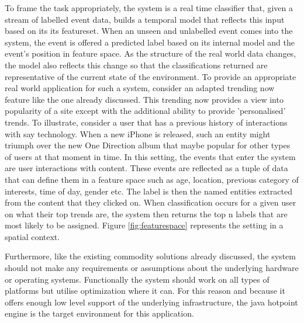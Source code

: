 \documentclass[a4paper,11pt]{scrreprt}
\begin{document}
To frame the task appropriately, the system is a real time classifier that, given a stream of labelled event data, builds a temporal model that reflects this input based on its its featureset. When an unseen and unlabelled event comes into the system, the event is offered a predicted label based on its internal model and the event's position in feature space. As the structure of the real world data changes, the model also reflects this change so that the classifications returned are representative of the current state of the environment. To provide an appropriate real world application for such a system, consider an adapted trending now feature like the one already discussed. This trending now provides a view into popularity of a site except with the additional ability to provide 'personalised' trends. To illustrate, consider a user that has a previous history of interactions with say technology. When a new iPhone is released, such an entity might triumph over the new One Direction album that maybe popular for other types of users at that moment in time. In this setting, the events that enter the system are user interactions with content. These events are reflected as a tuple of data that can define them in a feature space such as age, location, previous category of interests, time of day, gender etc. The label is then the named entities extracted from the content that they clicked on. When classification occurs for a given user on what their top trends are, the system then returns the top n labels that are most likely to be assigned. Figure \ref{fig:featurespace} represents the setting in a spatial context.

Furthermore, like the existing commodity solutions already discussed, the system should not make any requirements or assumptions about the underlying hardware or operating systems. Functionally the system should work on all types of platforms but utilise optimization where it can. For this reason and because it offers enough low level support of the underlying infrastructure, the java hotpoint engine is the target environment for this application.
 
\end{document}
